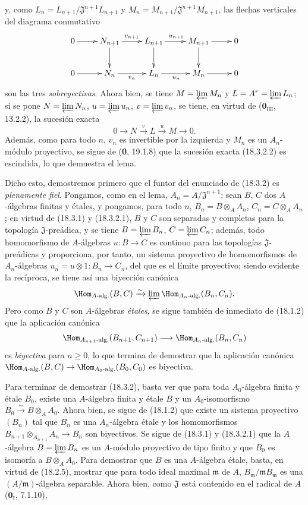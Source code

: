 
y, como $L_n=L_{n+1}/\mathfrak J^{n+1}L_{n+1}$ y $M_n=M_{n+1}/\mathfrak J^{n+1}M_{n+1}$, las flechas verticales del diagrama conmutativo
\[
\xymatrix{
0\ar[r] & N_{n+1}\ar[r]^{v_{n+1}}\ar[d] & L_{n+1}\ar[r]^{u_{n+1}}\ar[d] & M_{n+1}\ar[r]\ar[d] & 0\\
0\ar[r] & N_n\ar[r]_{v_n} & L_n\ar[r]_{u_n} & M_n\ar[r] & 0
}
\]
son las tres \emph{sobreyectivas}. Ahora bien, se tiene $M=\varprojlim M_n$ y $L=A^r=\varprojlim L_n$; si se pone $N=\varprojlim N_n$, $u=\varprojlim u_n$, $v=\varprojlim v_n$, se tiene, en virtud de ($\mathbf{0}_{\mathrm{III}}$, 13.2.2), la sucesión exacta
\begin{equation}
  0\longrightarrow N\xrightarrow{v}L\xrightarrow{u}M\longrightarrow 0.
  \tag{18.3.2.2}\label{IV.18.3.2.2}
\end{equation}
Además, como para todo $n$, $v_n$ es invertible por la izquierda y $M_n$ es un $A_n$-módulo proyectivo, se sigue de (\textbf 0, 19.1.8) que la sucesión exacta (18.3.2.2) es escindida, lo que demuestra el lema.

Dicho esto, demostremos primero que el funtor del enunciado de (18.3.2) es \emph{plenamente fiel}. Pongamos, como en el lema, $A_n=A/\mathfrak J^{n+1}$; sean $B$, $C$ dos $A$-álgebras finitas y étales, y pongamos, para todo $n$, $B_n=B\otimes_A A_n$, $C_n=C\otimes_A A_n$; en virtud de (18.3.1) y (18.3.2.1), $B$ y $C$ son separadas y completas para la topología $\mathfrak J$-preádica, y se tiene $B=\varprojlim B_n$, $C=\varprojlim C_n$; además, todo homomorfismo de $A$-álgebras $u:B\to C$ es continuo para las topologías $\mathfrak J$-preádicas y proporciona, por tanto, un sistema proyectivo de homomorfismos de $A_n$-álgebras $u_n=u\otimes 1:B_n\to C_n$, del que es el límite proyectivo; siendo evidente la recíproca, se tiene así una biyección canónica
\[
  \Hom_{A\text{-alg.}}(B,C)\xrightarrow{\sim}\varprojlim\Hom_{A_n\text{-alg.}}(B_n,C_n).
\]
Pero como $B$ y $C$ son $A$-álgebras \emph{étales}, se sigue también de inmediato de (18.1.2) que la aplicación canónica
\[
  \Hom_{A_{n+1}\text{-alg.}}(B_{n+1},C_{n+1})\longrightarrow\Hom_{A_n\text{-alg.}}(B_n,C_n)
\]
es \emph{biyectiva} para $n\geq 0$, lo que termina de demostrar que la aplicación canónica
$\Hom_{A\text{-alg.}}(B,C)\to\Hom_{A_0\text{-alg.}}(B_0,C_0)$
es biyectiva.

Para terminar de demostrar (18.3.2), basta ver que para toda $A_0$-álgebra finita y étale $B_0$, existe una $A$-álgebra finita y étale $B$ y un $A_0$-isomorfismo $B_0\xrightarrow{\sim}B\otimes_A A_0$. Ahora bien, se sigue de (18.1.2) que existe un sistema proyectivo $(B_n)$ tal que $B_n$ es una $A_n$-álgebra étale y los homomorfismos $B_{n+1}\otimes_{A_{n+1}}A_n\to B_n$ son biyectivos. Se sigue de (18.3.1) y (18.3.2.1) que la $A$-álgebra $B=\varprojlim B_n$ es un $A$-módulo proyectivo de tipo finito y que $B_0$ es isomorfa a $B\otimes_A A_0$. Para demostrar que $B$ es una $A$-álgebra étale, basta, en virtud de (18.2.5), mostrar que para todo ideal maximal $\mathfrak m$ de $A$, $B_{\mathfrak m}/\mathfrak mB_{\mathfrak m}$ es una $(A/\mathfrak m)$-álgebra separable. Ahora bien, como $\mathfrak J$ está contenido en el radical de $A$ ($\mathbf{0}_{\mathrm I}$, 7.1.10),

